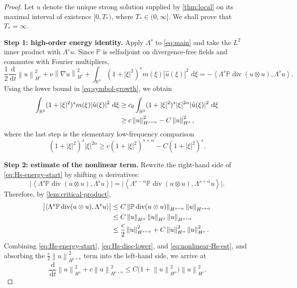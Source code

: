 \documentclass[11pt]{article}
\theoremstyle{definition}
\theoremstyle{remark}
\newcommand{\R}{\mathbb{R}}
\newcommand{\Pcal}{\mathbb{P}}
\newcommand{\dd}{\,\mathrm{d}}
\newcommand{\ip}[2]{\left\langle #1,#2\right\rangle}
\newcommand{\norm}[1]{\left\lVert #1\right\rVert}
\newcommand{\diver}{\operatorname{div}}
\begin{document}
\begin{proof}
Let $u$ denote the unique strong solution supplied by \cref{thm:local} on its maximal interval of existence $[0,T_*)$, where $T_*\in(0,\infty]$. We shall prove that $T_*=\infty$.

\smallskip
\noindent\textbf{Step 1: high-order energy identity.}
Apply $\Lambda^s$ to \eqref{eq:main} and take the $L^2$ inner product with $\Lambda^s u$. Since $\Pcal$ is selfadjoint on divergence-free fields and commutes with Fourier multipliers,
\begin{equation}\label{eq:Hs-energy-start}
\frac12\frac{\dd}{\dd t}\norm{u}_{H^s}^2
+\nu\norm{\nabla u}_{H^s}^2
+\int_{\R^3}(1+|\xi|^2)^s m(\xi)|\hat u(\xi)|^2\,\dd\xi
=-\ip{\Lambda^s \Pcal\diver(u\otimes u)}{\Lambda^s u}.
\end{equation}
Using the lower bound in \eqref{eq:symbol-growth}, we obtain
\begin{align}
\int_{\R^3}(1+|\xi|^2)^s m(\xi)|\hat u(\xi)|^2\,\dd\xi
&\ge c_0\int_{\R^3}(1+|\xi|^2)^s|\xi|^{2\alpha}|\hat u(\xi)|^2\,\dd\xi \notag\\
&\ge c\norm{u}_{H^{s+\alpha}}^2-C\norm{u}_{H^s}^2,
\label{eq:Hs-diss-lower}
\end{align}
where the last step is the elementary low-frequency comparison
\[
(1+|\xi|^2)^s|\xi|^{2\alpha}\ge c(1+|\xi|^2)^{s+\alpha}-C(1+|\xi|^2)^s.
\]

\smallskip
\noindent\textbf{Step 2: estimate of the nonlinear term.}
Rewrite the right-hand side of \eqref{eq:Hs-energy-start} by shifting $\alpha$ derivatives:
\[
\bigl|\ip{\Lambda^s \Pcal\diver(u\otimes u)}{\Lambda^s u}\bigr|
=
\bigl|\ip{\Lambda^{s-\alpha}\Pcal\diver(u\otimes u)}{\Lambda^{s+\alpha}u}\bigr|.
\]
Therefore, by \cref{lem:critical-product},
\begin{align}
\bigl|\ip{\Lambda^s \Pcal\diver(u\otimes u)}{\Lambda^s u}\bigr|
&\le C\norm{\Pcal\diver(u\otimes u)}_{H^{s-\alpha}}\norm{u}_{H^{s+\alpha}} \notag\\
&\le C\norm{u}_{H^\alpha}\norm{u}_{H^s}\norm{u}_{H^{s+\alpha}} \notag\\
&\le \frac{c}{2}\norm{u}_{H^{s+\alpha}}^2 + C\norm{u}_{H^\alpha}^2\norm{u}_{H^s}^2.
\label{eq:nonlinear-Hs-est}
\end{align}
Combining \eqref{eq:Hs-energy-start}, \eqref{eq:Hs-diss-lower}, and \eqref{eq:nonlinear-Hs-est}, and absorbing the $\frac c2\norm{u}_{H^{s+\alpha}}^2$ term into the left-hand side, we arrive at
\begin{equation}\label{eq:Hs-differential}
\frac{\dd}{\dd t}\norm{u}_{H^s}^2 + c\norm{u}_{H^{s+\alpha}}^2
\le C\bigl(1+\norm{u}_{H^\alpha}^2\bigr)\norm{u}_{H^s}^2.
\end{equation}


\end{proof}
\end{document}
